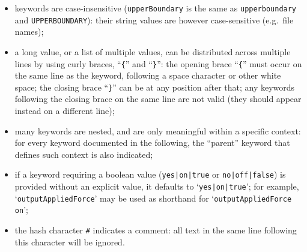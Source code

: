 \begin{itemize}

\item keywords are case-insensitive (\texttt{upperBoundary} is the same as \texttt{upperboundary} and \texttt{UPPERBOUNDARY}): their string values are however case-sensitive (e.g.~file names);

\item a long value, or a list of multiple values, can be distributed across multiple lines by using curly braces, ``\texttt{\{}'' and ``\texttt{\}}'': the opening brace ``\texttt{\{}'' must occur on the same line as the keyword, following a space character or other white space; the closing brace ``\texttt{\}}'' can be at any position after that; any keywords following the closing brace on the same line are not valid (they should appear instead on a different line);

\item many keywords are nested, and are only meaningful within a specific context: for every keyword documented in the following, the ``parent'' keyword that defines such context is also indicated;



\item if a keyword requiring a boolean value (\texttt{yes|on|true} or \texttt{no|off|false}) is provided without an explicit value, it defaults to `\texttt{yes|on|true}'; for example, `\texttt{outputAppliedForce}' may be used as shorthand for `\texttt{outputAppliedForce on}';

\item the hash character \texttt{\#} indicates a comment: all text in the same line following this character will be ignored.

\end{itemize}


